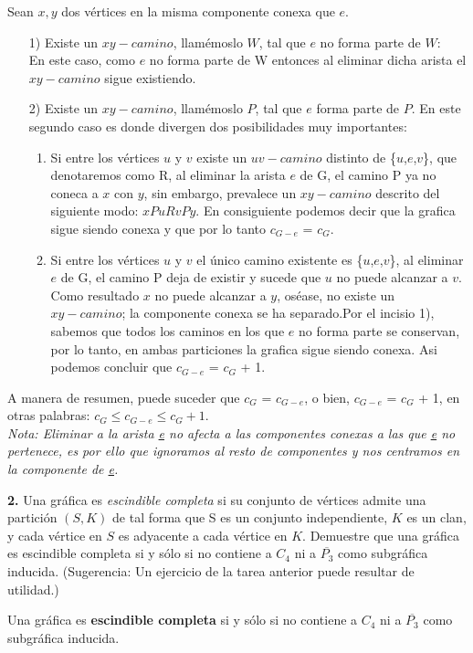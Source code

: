 \documentclass[12pt]{article}
\begin{document}
Sean $x,y$ dos vértices en la misma componente conexa que $e$.
\begin{enumerate}
 	\item [1)] Existe un $xy-camino$, llamémoslo  $W$, tal que $e$ no forma parte de $W$:\\
	En este caso, como $e$ no forma parte de W entonces al eliminar dicha arista el $xy-camino$ sigue existiendo.
	\item [2)]Existe un $xy-camino$, llamémoslo  $P$, tal que $e$ forma parte de $P$. En este segundo caso es donde divergen dos posibilidades muy 				importantes:
	\begin{enumerate}	
		\item Si entre los vértices $u$ y $v$ existe un $uv-camino$ distinto de \{$u$,$e$,$v$\}, que denotaremos como R, al eliminar la arista $e$ de G, el 	camino P ya no coneca a $x$ con $y$, sin embargo, prevalece un $xy-camino$ descrito del siguiente modo: $xPuRvPy$. En 	consiguiente podemos decir que la grafica sigue siendo conexa y que por lo tanto $c_{G-e}$ = $c_G$.
		
		\item Si entre los vértices $u$ y $v$ el único camino existente es \{$u$,$e$,$v$\}, al eliminar $e$ de G, el camino P deja de 		existir y sucede que $u$ no puede alcanzar a $v$. Como resultado $x$ no puede alcanzar a $y$, oséase, no existe un $xy-camino$; la componente conexa se ha separado.Por el incisio 1), sabemos que todos los caminos en los que $e$ no forma parte se conservan, por lo tanto, en ambas particiones la grafica sigue 	siendo conexa. Asi podemos concluir que $c_{G-e}$ = $c_G$ + 1.
	\end{enumerate}	
\end{enumerate}

A manera de resumen, puede suceder que $c_G$ = $c_{G-e}$, o bien, $c_{G-e}$ = $c_G$ + 1, en otras palabras: $c_G \leq c_{G - e} \leq c_G + 1$.\\

\textit{Nota: Eliminar a la arista \underline{e} no afecta a las componentes conexas a las que \underline{e} no pertenece, es por ello que ignoramos al resto de componentes y nos centramos en la componente de \underline{e}.}


\vspace{1cm}

%
%
\textbf{2.} Una gráfica es \textit{escindible completa} si su conjunto de vértices admite una partición $(S, K)$
de tal forma que S es un conjunto independiente, $K$ es un clan, y cada vértice en $S$ es
adyacente a cada vértice en $K$. Demuestre que una gráfica es escindible completa si y
sólo si no contiene a $C_4$ ni a $\overline{P_3}$ como subgráfica inducida. (Sugerencia: Un ejercicio de
la tarea anterior puede resultar de utilidad.)
\vspace{1cm}
\begin{tcolorbox}[title=\textbf{Hipótesis}, colback=red!15!white, colframe=black!]
	Una gráfica es \textbf{escindible completa} si y sólo si no contiene a $C_4$ ni a $\overline{P_3}$ como subgráfica inducida.
\end{tcolorbox}
	
\end{document}
